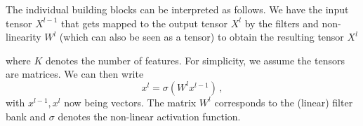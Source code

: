 The individual building blocks can be interpreted as follows. We have the input
tensor $X^{l-1}$ that gets mapped to the output tensor $X^l$ by the filters and
non-linearity $W^l$ (which can also be seen as a tensor) to obtain the resulting
tensor $X^l$
\begin{figure}[H]
  \centering
\end{figure}
where $K$ denotes the number of features. For simplicity, we assume the tensors
are matrices. We can then write
\begin{equation*}
  x^l = \sigma\left( W^l x^{l-1} \right)\,,
\end{equation*}
with $x^{l-1}, x^l$ now being vectors. The matrix $W^l$ corresponds to the
(linear) filter bank and $\sigma$ denotes the non-linear activation function.

